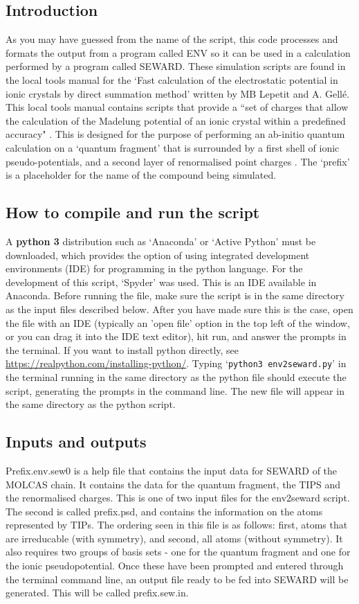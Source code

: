 \documentclass[10pt]{article}
\begin{document}
\subsection{Introduction}
As you may have guessed from the name of the script, this code processes and formats the output from a program called ENV so it can be used in a calculation performed by a program called SEWARD. These simulation scripts are found in the local tools manual for the `Fast calculation of the electrostatic potential in ionic crystals by direct summation method' written by MB Lepetit and A. Gellé. This local tools manual contains scripts that provide a ``set of charges that allow the calculation of the Madelung potential of an ionic crystal within a predefined accuracy" \cite{gelle2008fast}. This is designed for the purpose of performing an ab-initio quantum calculation on a `quantum fragment' that is surrounded by a first shell of ionic pseudo-potentials, and a second layer of renormalised point charges \cite{varignon2013ab}. The `prefix' is a placeholder for the name of the compound being simulated.

\subsection{How to compile and run the script}
A {\bf python 3} distribution such as `Anaconda' or `Active Python' must be downloaded, which provides the option of using integrated development environments (IDE) for programming in the python language. For the development of this script, `Spyder' was used. This is an IDE available in Anaconda. Before running the file, make sure the script is in the same directory as the input files described below. After you have made sure this is the case, open the file with an IDE (typically an 'open file' option in the top left of the window, or you can drag it into the IDE text editor), hit run, and answer the prompts in the terminal. If you want to install python directly, see \url{https://realpython.com/installing-python/}. Typing `\texttt{python3 env2seward.py}' in the terminal running in the same directory as the python file should execute the script, generating the prompts in the command line. The new file will appear in the same directory as the python script.

\subsection{Inputs and outputs}
Prefix.env.sew0 is a help file that contains the input data for SEWARD of the MOLCAS chain. It contains the data for the quantum fragment, the TIPS and the renormalised charges. This is one of two input files for the env2seward script. The second is called prefix.psd, and contains the information on the atoms represented by TIPs. The ordering seen in this file is as follows: first, atoms that are irreducable (with symmetry), and second, all atoms (without symmetry). It also requires two groups of basis sets - one for the quantum fragment and one for the ionic pseudopotential. Once these have been prompted and entered through the terminal command line, an output file ready to be fed into SEWARD will be generated. This will be called prefix.sew.in.
\end{document}
